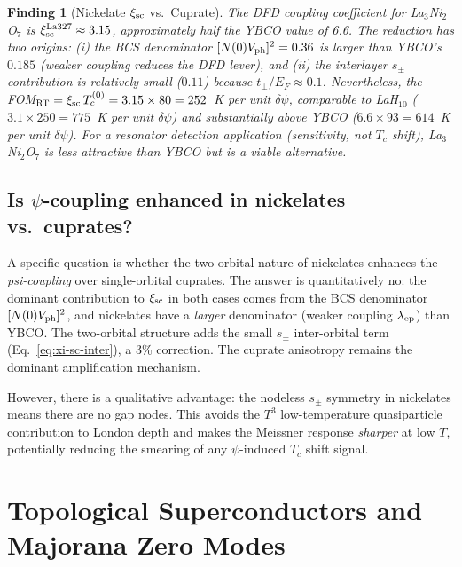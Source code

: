 \documentclass[11pt]{article}
\newtheorem{finding}{Finding}
\begin{document}
\begin{finding}[Nickelate $\xi_{\rm sc}$ vs.\ Cuprate]
\label{finding:xi-La327}
The DFD coupling coefficient for La$_3$Ni$_2$O$_7$ is
$\xi_{\rm sc}^{\rm La327} \approx 3.15$, approximately half the YBCO value
of 6.6. The reduction has two origins:
(i) the BCS denominator $[N(0)V_{\rm ph}]^2 = 0.36$ is larger than YBCO's
$0.185$ (weaker coupling reduces the DFD lever), and (ii) the interlayer
$s_\pm$ contribution is relatively small ($0.11$) because $t_\perp/E_F \approx 0.1$.
Nevertheless, the FOM$_{\rm RT} = \xi_{\rm sc}\,T_c^{(0)} = 3.15 \times 80
= 252$~K per unit $\delta\psi$, comparable to LaH$_{10}$
($3.1 \times 250 = 775$~K per unit $\delta\psi$) and substantially above
YBCO ($6.6 \times 93 = 614$~K per unit $\delta\psi$). For a resonator
detection application (sensitivity, not $T_c$ shift), La$_3$Ni$_2$O$_7$
is less attractive than YBCO but is a viable alternative.
\end{finding}

\subsection{Is $\psi$-coupling enhanced in nickelates vs.\ cuprates?}

A specific question is whether the two-orbital nature of nickelates
enhances the \emph{psi-coupling} over single-orbital cuprates.
The answer is quantitatively no: the dominant contribution to $\xi_{\rm sc}$
in both cases comes from the BCS denominator $[N(0)V_{\rm ph}]^2$, and
nickelates have a \emph{larger} denominator (weaker coupling $\lambda_{\rm ep}$)
than YBCO. The two-orbital structure adds the small $s_\pm$ inter-orbital
term (Eq.~\ref{eq:xi-sc-inter}), a 3\% correction. The cuprate
anisotropy remains the dominant amplification mechanism.

However, there is a qualitative advantage: the nodeless $s_\pm$ symmetry
in nickelates means there are no gap nodes. This avoids the $T^3$
low-temperature quasiparticle contribution to London depth and makes the
Meissner response \emph{sharper} at low $T$, potentially reducing the
smearing of any $\psi$-induced $T_c$ shift signal.

\section{Topological Superconductors and Majorana Zero Modes}
\label{sec:topological-sc}
\end{document}
